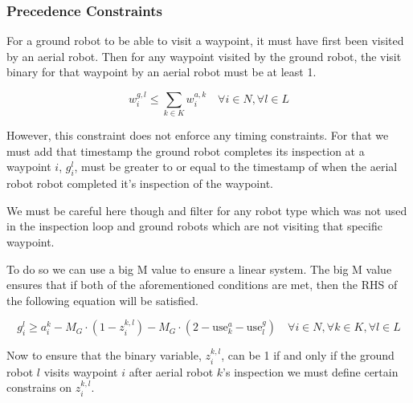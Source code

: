 \documentclass{article}
\begin{document}
			\subsubsection{Precedence Constraints}

				For a ground robot to be able to visit a waypoint, it must have first been visited by an aerial robot. 
				Then for any waypoint visited by the ground robot, the visit binary for that waypoint by an aerial robot must be at least 1.	

				\begin{equation}
					w_i^{g,l} \leq \sum_{k \in K} w_i^{a,k} \quad \forall i \in N, \forall l \in L
				\end{equation}


				However, this constraint does not enforce any timing constraints. For that we must add that timestamp the ground robot completes its inspection at a waypoint $i$, $g_i^l$, must be greater to or equal to the timestamp of when the aerial robot robot completed it's inspection of the waypoint.
				
				We must be careful here though and filter for any robot type which was not used in the inspection loop and ground robots which are not visiting that specific waypoint. 

				To do so we can use a big M value to ensure a linear system. The big M value ensures that if both of the aforementioned conditions are met, then the RHS of the following equation will be satisfied.

				\begin{equation}
					g_i^l \geq a_i^k - M_G \cdot (1 - z_i^{k,l}) - M_G \cdot (2 - \text{use}_k^a - \text{use}_l^g) \quad \forall i \in N, \forall k \in K, \forall l \in L
				\end{equation}

				

				\begin{comment}
					These four constraints ensure that z_i^{k,l} can only be 1 if all of the following are true:

					Ground robot l visits waypoint i (w_i^{g,l} = 1)
					Aerial robot k visits waypoint i (w_i^{a,k} = 1)
					Aerial robot k is being used (use_k^a = 1)
					Ground robot l is being used (use_l^g = 1)
				\end{comment}

				Now to ensure that the binary variable, $z_i^{k,l}$, can be 1 if and only if the ground robot $l$ visits waypoint $i$ after aerial robot $k$'s inspection we must define certain constrains on $z_i^{k,l}$.
\end{document}
